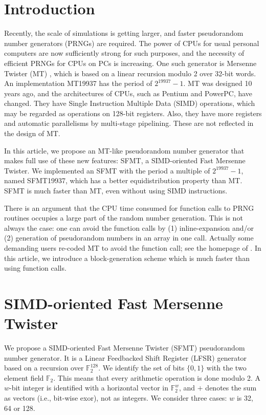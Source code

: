 \documentclass{svmult}
\def\F2{{\mathbb F}_2}
\begin{document}
\section{Introduction}
Recently, the scale of simulations is getting larger,
and faster pseudorandom number generators (PRNGs)
are required. The power of CPUs for
usual personal computers are now sufficiently strong
for such purposes, and the necessity of efficient PRNGs 
for CPUs on PCs is increasing.
One such generator is Mersenne Twister (MT) \cite{MT},
which is based on a linear recursion modulo 2 over 32-bit
words. An implementation MT19937 has 
the period of $2^{19937}-1$.
MT was designed 10 years ago,
and the architectures of CPUs,
such as Pentium and PowerPC, have changed.
They have
Single Instruction Multiple Data (SIMD) operations,
which may be regarded as operations 
on 128-bit registers. Also, they have more registers
and automatic parallelisms by multi-stage pipelining. 
These are not reflected in the design of MT. 

In this article, we propose an MT-like 
pseudorandom number generator
that makes full use of these new features: SFMT, 
a SIMD-oriented Fast Mersenne Twister. 
We implemented an SFMT with the period a multiple of $2^{19937}-1$, named
SFMT19937,
which has a better equidistribution property than MT. 
SFMT is much faster than MT, even without using SIMD instructions. 

There is an argument that the CPU time consumed for 
function calls to PRNG routines occupies a large part of
the random number generation.
This is not always the case: 
one can avoid the function calls by (1) inline-expansion
and/or (2) generation of pseudorandom numbers in an array
in one call. Actually some demanding users re-coded MT to avoid the 
function call; see the homepage of \cite{MT}. 
In this article, we introduce a block-generation scheme which 
is much faster than using function calls.

\section{SIMD-oriented Fast Mersenne Twister}\label{sec:jump}

We propose a SIMD-oriented Fast Mersenne Twister (SFMT) 
pseudorandom number generator. It is a
Linear Feedbacked Shift Register (LFSR) generator based
on a recursion over $\F2^{128}$.
We identify
the set of bits $\{0,1\}$
with the two element field $\F2$. This means that
every arithmetic operation is done modulo 2. 
A $w$-bit integer is identified with 
a horizontal vector in $\F2^{w}$, and 
$+$ denotes the sum as vectors (i.e., 
bit-wise exor), not as integers.
We consider three cases: $w$ is 32, 64 or 128.
\end{document}
